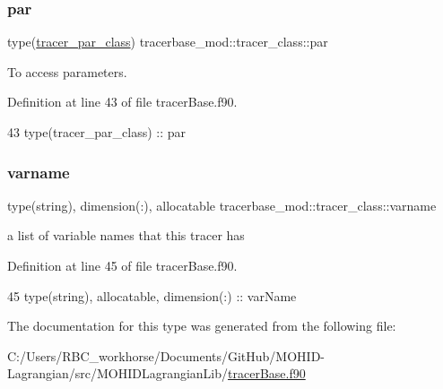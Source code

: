 \subsubsection{\texorpdfstring{par}{par}}
{\footnotesize\ttfamily type(\mbox{\hyperlink{structtracerbase__mod_1_1tracer__par__class}{tracer\+\_\+par\+\_\+class}}) tracerbase\+\_\+mod\+::tracer\+\_\+class\+::par\hspace{0.3cm}{\ttfamily [private]}}



To access parameters. 



Definition at line 43 of file tracer\+Base.\+f90.


\begin{DoxyCode}
43         \textcolor{keywordtype}{type}(tracer\_par\_class)   :: par
\end{DoxyCode}
\mbox{\label{structtracerbase__mod_1_1tracer__class_a1e2b7783171ffa22fa36b8d74063afff}} 
\subsubsection{\texorpdfstring{varname}{varname}}
{\footnotesize\ttfamily type(string), dimension(\+:), allocatable tracerbase\+\_\+mod\+::tracer\+\_\+class\+::varname\hspace{0.3cm}{\ttfamily [private]}}



a list of variable names that this tracer has 



Definition at line 45 of file tracer\+Base.\+f90.


\begin{DoxyCode}
45         \textcolor{keywordtype}{type}(string), \textcolor{keywordtype}{allocatable}, \textcolor{keywordtype}{dimension(:)} :: varName
\end{DoxyCode}


The documentation for this type was generated from the following file\+:\begin{DoxyCompactItemize}
\item 
C\+:/\+Users/\+R\+B\+C\+\_\+workhorse/\+Documents/\+Git\+Hub/\+M\+O\+H\+I\+D-\/\+Lagrangian/src/\+M\+O\+H\+I\+D\+Lagrangian\+Lib/\mbox{\hyperlink{tracer_base_8f90}{tracer\+Base.\+f90}}\end{DoxyCompactItemize}
